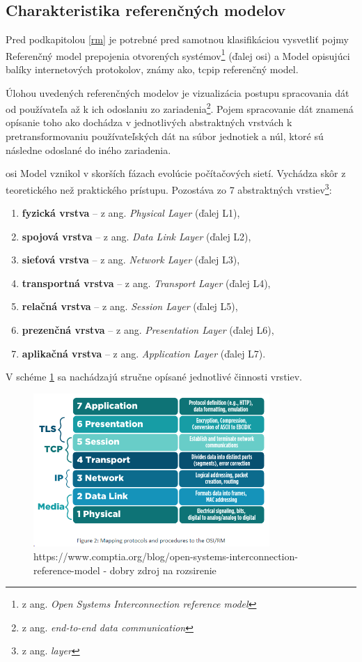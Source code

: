 \subsection{Charakteristika referenčných modelov}\label{crm}
Pred podkapitolou \ref{rm} je potrebné pred samotnou klasifikáciou vysvetliť pojmy Referenčný model prepojenia otvorených systémov\footnote{z ang. \textit{Open Systems Interconnection reference model}} (ďalej \acrshort{osi}) a Model opisujúci balíky internetových protokolov, známy ako, \acrshort{tcpip} referenčný model.

Úlohou uvedených referenčných modelov je vizualizácia postupu spracovania dát od používateľa až k ich odoslaniu zo zariadenia\footnote{z ang. \textit{end-to-end data communication}}. Pojem spracovanie dát znamená opísanie toho ako dochádza v jednotlivých abstraktných vrstvách k pretransformovaniu používateľských dát na súbor jednotiek a núl, ktoré sú následne odoslané do iného zariadenia. 

\acrshort{osi} Model vznikol v skorších fázach evolúcie počítačových sietí. Vychádza skôr z teoretického než praktického prístupu. Pozostáva zo 7 abstraktných vrstiev\footnote{z ang. \textit{layer}}:

\begin{enumerate}
	\item{\textbf{fyzická vrstva}} -- z ang. \textit{Physical Layer} (ďalej L1), 
	\item{\textbf{spojová vrstva}} -- z ang. \textit{Data Link Layer} (ďalej L2),
	\item{\textbf{sieťová vrstva}} -- z ang. \textit{Network Layer} (ďalej L3),
	\item{\textbf{transportná vrstva}} -- z ang. \textit{Transport Layer} (ďalej L4),
	\item{\textbf{relačná vrstva}} -- z ang. \textit{Session Layer} (ďalej L5),
	\item{\textbf{prezenčná vrstva}} -- z ang. \textit{Presentation Layer} (ďalej L6),
	\item{\textbf{aplikačná vrstva}} -- z ang. \textit{Application Layer} (ďalej L7).
\end{enumerate}

V schéme \ref{osi} sa nachádzajú stručne opísané jednotlivé činnosti vrstiev.
\begin{figure}[!h]
	\centering
	\includegraphics[width=0.8\textwidth]{figures/osi}
	\caption{https://www.comptia.org/blog/open-systems-interconnection-reference-model - dobry zdroj na rozsirenie}
	\label{osi}
\end{figure}


